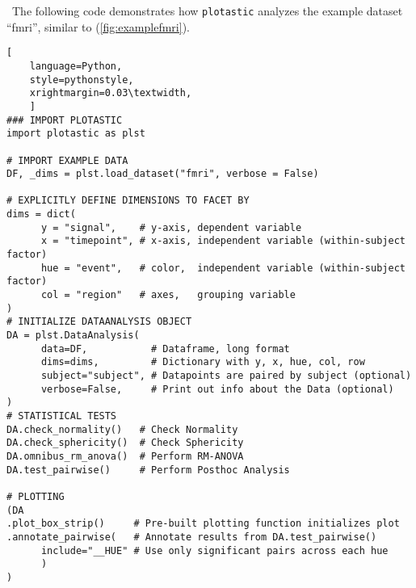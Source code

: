 \
The following code demonstrates how \texttt{plotastic} analyzes the
example dataset ``fmri'', similar to \citet{waskomSeabornStatisticalData2021}
(\autoref{fig:examplefmri}).

\begin{lstlisting}[
    language=Python, 
    style=pythonstyle,
    xrightmargin=0.03\textwidth,
    ]
### IMPORT PLOTASTIC
import plotastic as plst

# IMPORT EXAMPLE DATA
DF, _dims = plst.load_dataset("fmri", verbose = False)

# EXPLICITLY DEFINE DIMENSIONS TO FACET BY
dims = dict(
      y = "signal",    # y-axis, dependent variable
      x = "timepoint", # x-axis, independent variable (within-subject factor)
      hue = "event",   # color,  independent variable (within-subject factor)
      col = "region"   # axes,   grouping variable
)
# INITIALIZE DATAANALYSIS OBJECT
DA = plst.DataAnalysis(
      data=DF,           # Dataframe, long format
      dims=dims,         # Dictionary with y, x, hue, col, row 
      subject="subject", # Datapoints are paired by subject (optional)
      verbose=False,     # Print out info about the Data (optional)
)
# STATISTICAL TESTS
DA.check_normality()   # Check Normality
DA.check_sphericity()  # Check Sphericity
DA.omnibus_rm_anova()  # Perform RM-ANOVA
DA.test_pairwise()     # Perform Posthoc Analysis

# PLOTTING
(DA
.plot_box_strip()     # Pre-built plotting function initializes plot
.annotate_pairwise(   # Annotate results from DA.test_pairwise()
      include="__HUE" # Use only significant pairs across each hue
      ) 
)
\end{lstlisting}



\label{fig:examplefmri}



